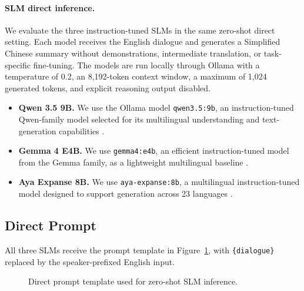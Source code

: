 \documentclass[11pt]{article}
\begin{document}
\paragraph{SLM direct inference.}

We evaluate the three instruction-tuned SLMs in the same zero-shot direct setting. Each model receives the English dialogue and generates a Simplified Chinese summary without demonstrations, intermediate translation, or task-specific fine-tuning. The models are run locally through Ollama with a temperature of 0.2, an 8,192-token context window, a maximum of 1,024 generated tokens, and explicit reasoning output disabled.

\begin{itemize}
    \item \textbf{Qwen 3.5 9B.} We use the Ollama model \texttt{qwen3.5:9b}, an instruction-tuned Qwen-family model selected for its multilingual understanding and text-generation capabilities \citep{qwenteam2026qwen35omnitechnicalreport}.

    \item \textbf{Gemma 4 E4B.} We use \texttt{gemma4:e4b}, an efficient instruction-tuned model from the Gemma family, as a lightweight multilingual baseline \citep{gemma4_2026}.

    \item \textbf{Aya Expanse 8B.} We use \texttt{aya-expanse:8b}, a multilingual instruction-tuned model designed to support generation across 23 languages \citep{dang2024ayaexpansecombiningresearch}.
\end{itemize}

\subsection{Direct Prompt}
\label{sec:appendix-direct-prompt}

All three SLMs receive the prompt template in Figure~\ref{fig:direct-prompt}, with \texttt{\{dialogue\}} replaced by the speaker-prefixed English input.

\begin{figure}[H]
\centering
{}
\caption{Direct prompt template used for zero-shot SLM inference.}
\label{fig:direct-prompt}
\end{figure}
\end{document}

